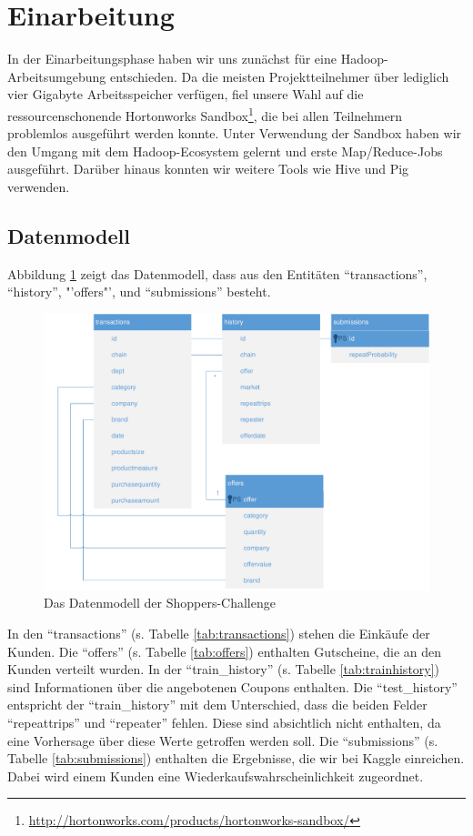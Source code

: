\section{Einarbeitung}
In der Einarbeitungsphase haben wir uns zunächst für eine Hadoop-Arbeitsumgebung entschieden. Da die meisten Projektteilnehmer über lediglich vier Gigabyte Arbeitsspeicher verfügen, fiel unsere Wahl auf die ressourcenschonende Hortonworks Sandbox\footnote{\url{http://hortonworks.com/products/hortonworks-sandbox/}}, die bei allen Teilnehmern problemlos ausgeführt werden konnte. Unter Verwendung der Sandbox haben wir den Umgang mit dem Hadoop-Ecosystem gelernt und erste Map/Reduce-Jobs ausgeführt. Darüber hinaus konnten wir weitere Tools wie Hive und Pig verwenden.

\renewcommand{\arraystretch}{1.3}

\subsection{Datenmodell}
Abbildung \ref{fig:ShoppersTables} zeigt das Datenmodell, dass aus den Entitäten "`transactions"', "`history"', "'offers"', und "`submissions"' besteht. 

\begin{figure}[H]
\centering
\includegraphics[width=0.9\linewidth]{Bilder/ShoppersTables}
\caption{Das Datenmodell der Shoppers-Challenge}
\label{fig:ShoppersTables}
\end{figure}

In den "`transactions"' (s. Tabelle \ref{tab:transactions}) stehen die Einkäufe der Kunden.
Die "`offers"' (s. Tabelle \ref{tab:offers}) enthalten Gutscheine, die an den Kunden verteilt wurden.
In der "`train\_history"' (s. Tabelle \ref{tab:trainhistory}) sind Informationen über die angebotenen Coupons enthalten.
Die "`test\_history"' entspricht der "`train\_history"' mit dem Unterschied, dass die beiden Felder "`repeattrips"' und "`repeater"' fehlen. Diese sind absichtlich nicht enthalten, da eine Vorhersage über diese Werte getroffen werden soll.
Die "`submissions"' (s. Tabelle \ref{tab:submissions}) enthalten die Ergebnisse, die wir bei Kaggle einreichen. Dabei wird einem Kunden eine Wiederkaufswahrscheinlichkeit zugeordnet.

